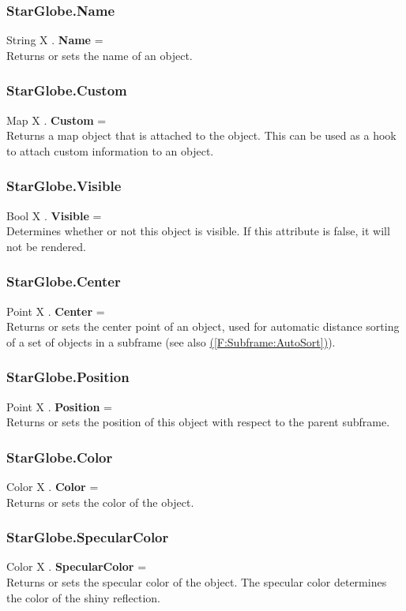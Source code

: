 \documentclass[10pt]{book}
\newcommand{\linkitem}[1]{\hyperref[#1]{\nameref{#1} (\ref{#1})}}
\begin{document}
\subsubsection{StarGlobe.Name \label{F:StarGlobe:Name}}
String X . \textbf{Name} = \\
Returns or sets the name of an object.

\subsubsection{StarGlobe.Custom \label{F:StarGlobe:Custom}}
Map X . \textbf{Custom} = \\
Returns a map object that is attached to the object. This can be used as a hook to attach custom information to an object.


\subsubsection{StarGlobe.Visible \label{F:StarGlobe:Visible}}
Bool X . \textbf{Visible} = \\
Determines whether or not this object is visible. If this attribute is false, it will not be rendered.

\subsubsection{StarGlobe.Center \label{F:StarGlobe:Center}}
Point X . \textbf{Center} = \\
Returns or sets the center point of an object, used for automatic distance sorting of a set of objects in a subframe (see also \linkitem{F:Subframe:AutoSort}).

\subsubsection{StarGlobe.Position \label{F:StarGlobe:Position}}
Point X . \textbf{Position} = \\
Returns or sets the position of this object with respect to the parent subframe.

\subsubsection{StarGlobe.Color \label{F:StarGlobe:Color}}
Color X . \textbf{Color} = \\
Returns or sets the color of the object.

\subsubsection{StarGlobe.SpecularColor \label{F:StarGlobe:SpecularColor}}
Color X . \textbf{SpecularColor} = \\
Returns or sets the specular color of the object. The specular color determines the color of the shiny reflection.
\end{document}
